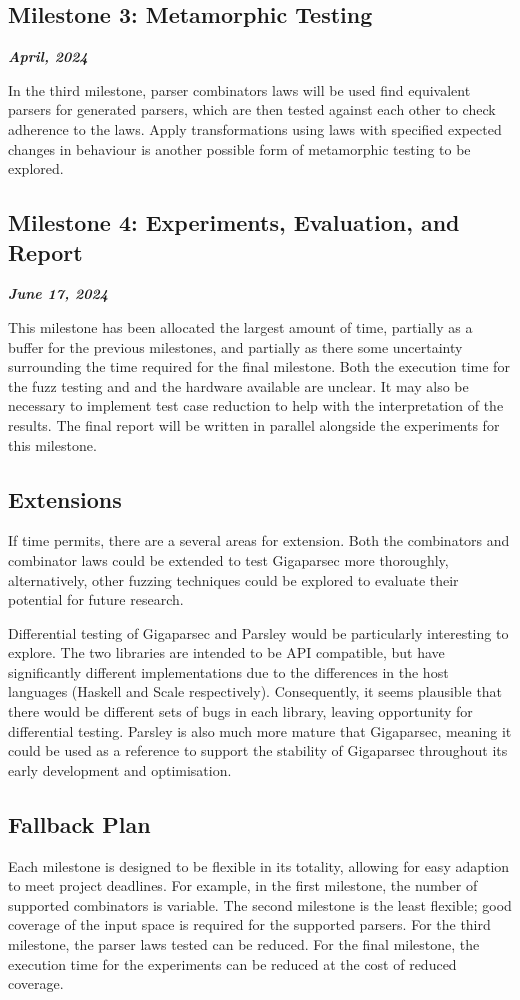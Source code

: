 \documentclass{article}
\newcommand{\be}[1]{\textbf{\emph{#1}}}
\begin{document}
\subsection{Milestone 3: Metamorphic Testing}
\be{April, 2024}

In the third milestone, parser combinators laws will be used find equivalent parsers for generated parsers, which are then tested against each other to check adherence to the laws. Apply transformations using laws with specified expected changes in behaviour is another possible form of metamorphic testing to be explored.

\subsection{Milestone 4: Experiments, Evaluation, and Report}
\be{June 17, 2024}

This milestone has been allocated the largest amount of time, partially as a buffer for the previous milestones, and partially as there some uncertainty surrounding the time required for the final milestone. Both the execution time for the fuzz testing and and the hardware available are unclear. It may also be necessary to implement test case reduction to help with the interpretation of the results. The final report will be written in parallel alongside the experiments for this milestone.

\subsection{Extensions}

If time permits, there are a several areas for extension. Both the combinators and combinator laws could be extended to test Gigaparsec more thoroughly, alternatively, other fuzzing techniques could be explored to evaluate their potential for future research.

Differential testing of Gigaparsec and Parsley \cite{garnishing} would be particularly interesting to explore. The two libraries are intended to be API compatible, but have significantly different implementations due to the differences in the host languages (Haskell and Scale respectively). Consequently, it seems plausible that there would be different sets of bugs in each library, leaving opportunity for differential testing. Parsley is also much more mature that Gigaparsec, meaning it could be used as a reference to support the stability of Gigaparsec throughout its early development and optimisation.

\subsection{Fallback Plan}
Each milestone is designed to be flexible in its totality, allowing for easy adaption to meet project deadlines. For example, in the first milestone, the number of supported combinators is variable. The second milestone is the least flexible; good coverage of the input space is required for the supported parsers. For the third milestone, the parser laws tested can be reduced. For the final milestone, the execution time for the experiments can be reduced at the cost of reduced coverage.

\raggedright

\end{document}
